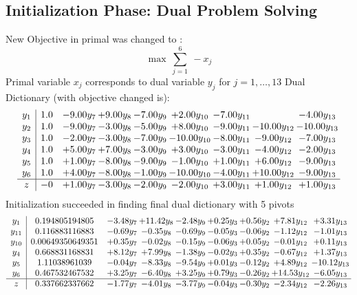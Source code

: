 \documentclass[8pt]{article}
\begin{document}
\subsection{Initialization Phase: Dual Problem Solving}
New Objective in primal was changed to : \[ \max\ \sum_{j=1}^{6}\ - x_j \] 
Primal variable $x_j$ corresponds to dual variable $y_j$ for $j = 1,\ldots,13$
Dual Dictionary (with objective changed is): 
\[\begin{array}{c| c c@{\hskip 2pt} c@{\hskip 2pt} c@{\hskip 2pt} c@{\hskip 2pt} c@{\hskip 2pt} c@{\hskip 2pt} c@{\hskip 2pt} }
 y_{1}   &  1.0 & -9.00 y_{7} & +  9.00 y_{8} & -7.00 y_{9} & +  2.00 y_{10} & -7.00 y_{11} &   & -4.00 y_{13}\\
 y_{2}   &  1.0 & -9.00 y_{7} & -3.00 y_{8} & -5.00 y_{9} & +  8.00 y_{10} & -9.00 y_{11} & -10.00 y_{12} & -10.00 y_{13}\\
 y_{3}   &  1.0 & -2.00 y_{7} & -3.00 y_{8} & -7.00 y_{9} & -10.00 y_{10} & -8.00 y_{11} & -9.00 y_{12} & -7.00 y_{13}\\
 y_{4}   &  1.0 & +  5.00 y_{7} & +  7.00 y_{8} & -3.00 y_{9} & +  3.00 y_{10} & -3.00 y_{11} & -4.00 y_{12} & -2.00 y_{13}\\
 y_{5}   &  1.0 & +  1.00 y_{7} & -8.00 y_{8} & -9.00 y_{9} & -1.00 y_{10} & +  1.00 y_{11} & +  6.00 y_{12} & -9.00 y_{13}\\
 y_{6}   &  1.0 & +  4.00 y_{7} & -8.00 y_{8} & -1.00 y_{9} & -10.00 y_{10} & -4.00 y_{11} & + 10.00 y_{12} & -9.00 y_{13}\\
\hline
z    &  -0 & +  1.00 y_{7} & -3.00 y_{8} & -2.00 y_{9} & -2.00 y_{10} & +  3.00 y_{11} & +  1.00 y_{12} & +  1.00 y_{13}\\
\end{array}\]
Initialization succeeded in finding final dual dictionary with 5 pivots
\[\begin{array}{c| c c@{\hskip 2pt} c@{\hskip 2pt} c@{\hskip 2pt} c@{\hskip 2pt} c@{\hskip 2pt} c@{\hskip 2pt} c@{\hskip 2pt} }
 y_{1}   &  0.194805194805 & -3.48 y_{7} & + 11.42 y_{8} & -2.48 y_{9} & +  0.25 y_{3} & +  0.56 y_{2} & +  7.81 y_{12} & +  3.31 y_{13}\\
 y_{11}   &  0.116883116883 & -0.69 y_{7} & -0.35 y_{8} & -0.69 y_{9} & -0.05 y_{3} & -0.06 y_{2} & -1.12 y_{12} & -1.01 y_{13}\\
 y_{10}   &  0.00649350649351 & +  0.35 y_{7} & -0.02 y_{8} & -0.15 y_{9} & -0.06 y_{3} & +  0.05 y_{2} & -0.01 y_{12} & +  0.11 y_{13}\\
 y_{4}   &  0.668831168831 & +  8.12 y_{7} & +  7.99 y_{8} & -1.38 y_{9} & -0.02 y_{3} & +  0.35 y_{2} & -0.67 y_{12} & +  1.37 y_{13}\\
 y_{5}   &  1.11038961039 & -0.04 y_{7} & -8.33 y_{8} & -9.54 y_{9} & +  0.01 y_{3} & -0.12 y_{2} & +  4.89 y_{12} & -10.12 y_{13}\\
 y_{6}   &  0.467532467532 & +  3.25 y_{7} & -6.40 y_{8} & +  3.25 y_{9} & +  0.79 y_{3} & -0.26 y_{2} & + 14.53 y_{12} & -6.05 y_{13}\\
\hline
z    &  0.337662337662 & -1.77 y_{7} & -4.01 y_{8} & -3.77 y_{9} & -0.04 y_{3} & -0.30 y_{2} & -2.34 y_{12} & -2.26 y_{13}\\
\end{array}\]
\end{document}

